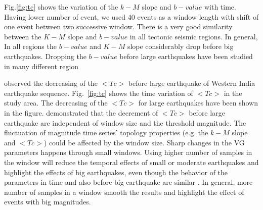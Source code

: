 \noindent 
Fig.\ref{fig:tc}  shows the variation of the $k-M$ slope and $b-value$ with time. Having lower number of event, we used 40 events as a window length with shift of one event between two successive window. There is a very good similarity between the $K-M$ slope and $b-value$ in all tectonic seismic regions. In general, In all regions the $b-value$ and $K-M$ slope considerably drop before big earthquakes. Dropping the $b-value$ before large earthquakes have been studied in many different region \citep[e.g.][]{Wyss2000,Wyss2006,Schorlemmer2005,Chan2012}

\noindent
\citet{Telesca2016} observed the decreasing of the $<Tc>$ before large earthquake of Western India earthquake sequence. Fig.~\ref{fig:tc} shows the time variation of $<Tc>$ in the study area. The decreasing of the $<Tc>$ for large earthquakes have been shown in the figure. \citet{Telesca2016} demonstrated that the decrement of $<Tc>$ before large earthquake are independent of window size and the threshold magnitude. The fluctuation of magnitude time series' topology properties (e.g. the $k-M$ slope and $<Tc>$) could be affected by the window size. Sharp changes in the VG parameters happens through small windows. Using higher number of samples in the window will reduce the temporal effects of small or moderate earthquakes and highlight the effects of big earthquakes, even though the behavior of the parameters in time and also before big earthquake are similar \citep{Telesca2016}. In general, more number of samples in a window smooth the results and highlight the effect of events with big magnitudes. 
 

